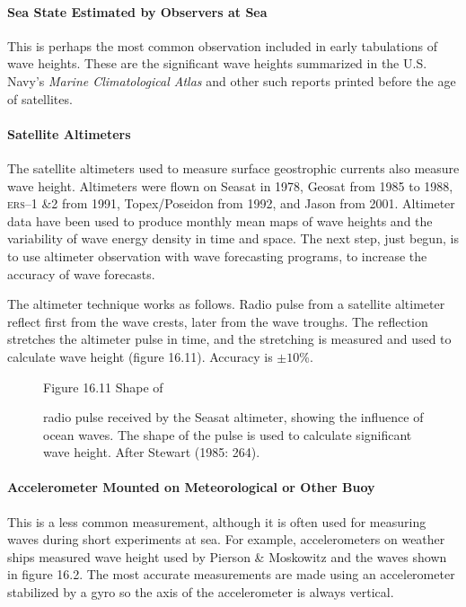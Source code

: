 \paragraph{Sea State Estimated by Observers at Sea} This is perhaps the most common observation included in early tabulations of wave heights. These are the significant wave heights summarized in the U.S. Navy's \textit{Marine Climatological Atlas} and other such reports printed before the age of satellites.

\paragraph{Satellite Altimeters} The satellite altimeters used to measure surface geo\-strophic currents also measure wave height. Altimeters were flown on Seasat in 1978, Geosat from 1985 to 1988, \textsc{ers--1 \&2} from 1991, Topex/Poseidon from 1992, and Jason from 2001. Altimeter data have been used to produce monthly mean maps of wave heights and the variability of wave energy density in time and space. The next step, just begun, is to use altimeter observation with wave forecasting programs, to increase the accuracy of wave forecasts.

The altimeter technique works as follows. Radio pulse from a satellite altimeter reflect first from the wave crests, later from the wave troughs. The reflection stretches the altimeter pulse in time, and the stretching is measured and used to calculate wave height (figure 16.11). Accuracy is $\pm 10$\%.

\begin{figure}[t!]
\footnotesize
Figure 16.11 Shape of \rule{0mm}{4ex}radio pulse received by the Seasat altimeter, showing the influence of ocean waves. The shape of the pulse is used to calculate significant wave height. After Stewart (1985: 264).
\label{fig:altimeterpulse}
\vspace{-3ex}
\end{figure}

\paragraph{Accelerometer Mounted on Meteorological or Other Buoy} This is a less common measurement, although it is often used for measuring waves during short experiments at sea. For example, accelerometers on weather ships measured wave height used by Pierson \& Moskowitz and the waves shown in figure 16.2. The most accurate measurements are made using an accelerometer stabilized by a gyro so the axis of the accelerometer is always vertical.

